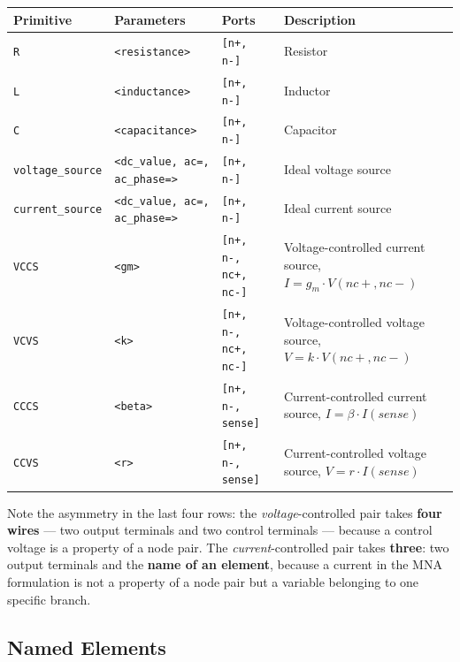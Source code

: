 \documentclass[11pt, a4paper]{article}
\newcommand{\code}[1]{\texttt{\small #1}}
\begin{document}
\begin{center}
\begin{tabular}{@{} L{3.2cm} L{2.8cm} L{3.2cm} L{4cm} @{}}
  \toprule
  \textbf{Primitive} & \textbf{Parameters} & \textbf{Ports} & \textbf{Description} \\
  \midrule
  \code{R}              & \code{<resistance>}  & \code{[n+, n-]}              & Resistor \\
  \code{L}              & \code{<inductance>}  & \code{[n+, n-]}              & Inductor \\
  \code{C}              & \code{<capacitance>} & \code{[n+, n-]}              & Capacitor \\
  \code{voltage\_source} & \code{<dc\_value, ac=, ac\_phase=>}   & \code{[n+, n-]}              & Ideal voltage source \\
  \code{current\_source} & \code{<dc\_value, ac=, ac\_phase=>}   & \code{[n+, n-]}              & Ideal current source \\
  \code{VCCS}           & \code{<gm>}          & \code{[n+, n-, nc+, nc-]}    & Voltage-controlled current source, \(I = g_m \cdot V(nc\!+\!,nc\!-\!)\) \\
  \code{VCVS}           & \code{<k>}           & \code{[n+, n-, nc+, nc-]}    & Voltage-controlled voltage source, \(V = k \cdot V(nc\!+\!,nc\!-\!)\) \\
  \code{CCCS}           & \code{<beta>}        & \code{[n+, n-, sense]}       & Current-controlled current source, \(I = \beta \cdot I(sense)\) \\
  \code{CCVS}           & \code{<r>}           & \code{[n+, n-, sense]}       & Current-controlled voltage source, \(V = r \cdot I(sense)\) \\
  \bottomrule
\end{tabular}
\end{center}

\noindent Note the asymmetry in the last four rows: the \textit{voltage}-controlled
pair takes \textbf{four wires} --- two output terminals and two control
terminals --- because a control voltage is a property of a node pair. The
\textit{current}-controlled pair takes \textbf{three}: two output terminals and
the \textbf{name of an element}, because a current in the MNA formulation is not
a property of a node pair but a variable belonging to one specific branch.

\subsection{Named Elements}
\label{sec:namedelements}
\end{document}
